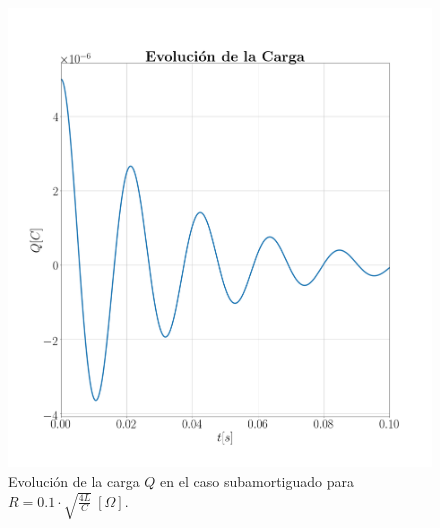 \documentclass[journal]{IEEEtran}
\begin{document}
\begin{figure}[!htb]
    \centering
    \includegraphics[width=\linewidth,trim={70 70 70 70},clip]{cargasubamortiguado.png}
    \caption{Evolución de la carga $Q$ en el caso subamortiguado para $R=0.1 \cdot\sqrt{\frac{4L}{C}}~[\Omega]$.}
    \label{fig:cargaamortiguado}
\end{figure}
\end{document}
